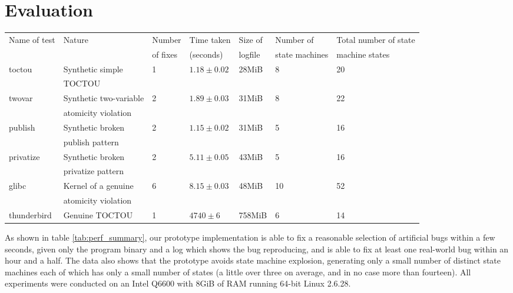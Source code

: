 \documentclass[10pt,twocolumn,preprint,natbib,authoryear]{sigplanconf}
\begin{document}
\section{Evaluation}
\label{sect:evaluation}

\begin{table*}
\begin{tabular}{lllllll}
Name of test & Nature & Number & Time taken & Size of & Number of & Total number of state\\
 & & of fixes & (seconds) & logfile & state machines & machine states\\
\hline
toctou & Synthetic simple & 1 & $1.18 \pm 0.02$ & 28MiB & 8 & 20\\
       & TOCTOU & & & \\
twovar & Synthetic two-variable & 2 & $1.89 \pm 0.03$ & 31MiB & 8 & 22\\
       & atomicity violation &&&\\
publish & Synthetic broken & 2 & $1.15 \pm 0.02$ & 31MiB & 5 & 16 \\
        & publish pattern & & & \\
privatize & Synthetic broken & 2 & $5.11 \pm 0.05$ & 43MiB & 5 & 16 \\
          & privatize pattern & & & \\
\hline
glibc & Kernel of a genuine & 6 & $8.15 \pm 0.03$ & 48MiB & 10 & 52\\
      & atomicity violation & & & \\
\hline
thunderbird & Genuine TOCTOU & 1 & $4740 \pm 6$ & 758MiB & 6 & 14
\end{tabular}
\caption{Summary of results obtained from running the fix generating
  tool on a single log file collected from each bug.  Timing
  information is mean and standard deviation from five runs.}
\label{tab:perf_summary}
\end{table*}

As shown in table \ref{tab:perf_summary}, our prototype implementation
is able to fix a reasonable selection of artificial bugs within a few
seconds, given only the program binary and a log which shows the bug
reproducing, and is able to fix at least one real-world bug within an
hour and a half.  The data also shows that the prototype avoids state
machine explosion, generating only a small number of distinct state
machines each of which has only a small number of states (a little
over three on average, and in no case more than fourteen).  All
experiments were conducted on an Intel Q6600 with 8GiB of RAM running
64-bit Linux 2.6.28.
\end{document}
